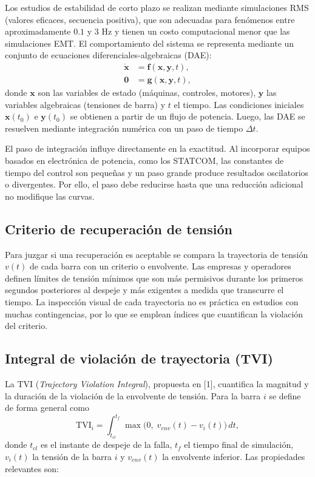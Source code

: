 Los estudios de estabilidad de corto plazo se realizan mediante simulaciones RMS (valores eficaces, secuencia positiva), que son adecuadas para fenómenos entre aproximadamente $0.1$ y $3$ Hz y tienen un costo computacional menor que las simulaciones EMT. El comportamiento del sistema se representa mediante un conjunto de ecuaciones diferenciales-algebraicas (DAE):
\begin{align}
    \dot{\mathbf{x}} &= \mathbf{f}(\mathbf{x}, \mathbf{y}, t), \\
    \mathbf{0} &= \mathbf{g}(\mathbf{x}, \mathbf{y}, t),
\end{align}
donde $\mathbf{x}$ son las variables de estado (máquinas, controles, motores), $\mathbf{y}$ las variables algebraicas (tensiones de barra) y $t$ el tiempo. Las condiciones iniciales $\mathbf{x}(t_0)$ e $\mathbf{y}(t_0)$ se obtienen a partir de un flujo de potencia. Luego, las DAE se resuelven mediante integración numérica con un paso de tiempo $\Delta t$.

El paso de integración influye directamente en la exactitud. Al incorporar equipos basados en electrónica de potencia, como los STATCOM, las constantes de tiempo del control son pequeñas y un paso grande produce resultados oscilatorios o divergentes. Por ello, el paso debe reducirse hasta que una reducción adicional no modifique las curvas.

\subsection{Criterio de recuperación de tensión}

Para juzgar si una recuperación es aceptable se compara la trayectoria de tensión $v(t)$ de cada barra con un criterio o envolvente. Las empresas y operadores definen límites de tensión mínimos que son más permisivos durante los primeros segundos posteriores al despeje y más exigentes a medida que transcurre el tiempo. La inspección visual de cada trayectoria no es práctica en estudios con muchas contingencias, por lo que se emplean índices que cuantifican la violación del criterio.

\subsection{Integral de violación de trayectoria (TVI)}

La TVI (\textit{Trajectory Violation Integral}), propuesta en [1], cuantifica la magnitud y la duración de la violación de la envolvente de tensión. Para la barra $i$ se define de forma general como
\begin{equation}
    \mathrm{TVI}_i = \int_{t_{cl}}^{t_f} \max\!\big(0,\; v_{env}(t) - v_i(t)\big)\, dt,
    \label{eq:tvi}
\end{equation}
donde $t_{cl}$ es el instante de despeje de la falla, $t_f$ el tiempo final de simulación, $v_i(t)$ la tensión de la barra $i$ y $v_{env}(t)$ la envolvente inferior. Las propiedades relevantes son:

